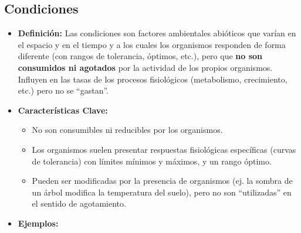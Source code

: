 \documentclass[
]{book}
\providecommand{\tightlist}{%
  \setlength{\itemsep}{0pt}\setlength{\parskip}{0pt}}
\begin{document}
\subsection*{\texorpdfstring{\textbf{Condiciones}}{Condiciones}}\label{condiciones}

\begin{itemize}
\tightlist
\item
  \textbf{Definición:} Las condiciones son factores ambientales abióticos que varían en el espacio y en el tiempo y a los cuales los organismos responden de forma diferente (con rangos de tolerancia, óptimos, etc.), pero que \textbf{no son consumidos ni agotados} por la actividad de los propios organismos. Influyen en las tasas de los procesos fisiológicos (metabolismo, crecimiento, etc.) pero no se ``gastan''.
\item
  \textbf{Características Clave:}

  \begin{itemize}
  \tightlist
  \item
    No son consumibles ni reducibles por los organismos.
  \item
    Los organismos suelen presentar respuestas fisiológicas específicas (curvas de tolerancia) con límites mínimos y máximos, y un rango óptimo.
  \item
    Pueden ser modificadas por la presencia de organismos (ej. la sombra de un árbol modifica la temperatura del suelo), pero no son ``utilizadas'' en el sentido de agotamiento.
  \end{itemize}
\item
  \textbf{Ejemplos:}


\end{itemize}
\end{document}
